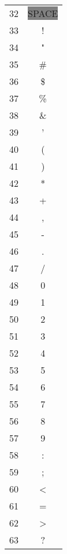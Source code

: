 {\begin{tabular}{c c}
  \hline
   32 & \colorbox{gray}{SPACE} \\
   33 & ! \\
   34 & " \\
   35 & \# \\
   36 & \$ \\
   37 & \% \\
   38 & \& \\
   39 & ' \\
   40 & ( \\
   41 & ) \\
   42 & * \\
   43 & + \\
   44 & , \\
   45 & - \\
   46 & . \\
   47 & / \\
   48 & 0 \\
   49 & 1 \\
   50 & 2 \\
   51 & 3 \\
   52 & 4 \\
   53 & 5 \\
   54 & 6 \\
   55 & 7 \\
   56 & 8 \\
   57 & 9 \\
   58 & : \\
   59 & ; \\
   60 & < \\
   61 & = \\
   62 & > \\
   63 & ? \\
\end{tabular}

}
